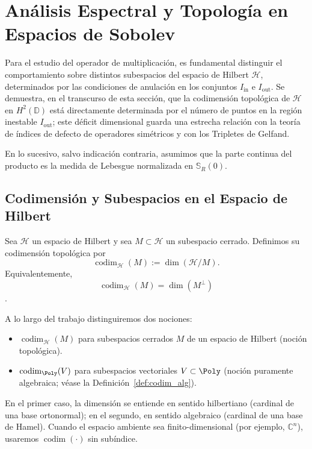 
\chapter{Análisis Espectral y Topología en Espacios de Sobolev}\label{sec:espectral}

Para el estudio del operador de multiplicación, es fundamental distinguir el comportamiento sobre distintos subespacios del espacio de Hilbert $\mathcal{H}$, determinados por las condiciones de anulación en los conjuntos $I_{\mathrm{in}}$ e $I_{\mathrm{out}}$. Se demuestra, en el transcurso de esta sección, que la codimensión topológica de $\mathcal{H}$ en $H^2(\mathbb{D})$ está directamente determinada por el número de puntos en la región inestable $I_{\mathrm{out}}$; este déficit dimensional guarda una estrecha relación con la teoría de índices de defecto de operadores simétricos y con los Tripletes de Gelfand.

\begin{rmk}
	En lo sucesivo, salvo indicación contraria, asumimos que la parte continua del producto es la medida de Lebesgue normalizada en $\mathbb{S}_R(0)$.
\end{rmk}

\section{Codimensión y Subespacios en el Espacio de Hilbert}

\begin{defn}\label{def:codim_top_hilbert}
	Sea $\mathcal{H}$ un espacio de Hilbert y sea $M\subset \mathcal{H}$ un subespacio cerrado. Definimos su codimensión topológica por
	$$
		\operatorname{codim}_{\mathcal{H}}(M):=\dim(\mathcal{H}/M).
	$$
	Equivalentemente,
	$$
		\operatorname{codim}_{\mathcal{H}}(M)=\dim(M^\perp)
	$$
	\cite{halmos1982hilbert}.
\end{defn}

\begin{rmk}\label{rem:convencion_codim}
	A lo largo del trabajo distinguiremos dos nociones:
	\begin{itemize}
		\item $\operatorname{codim}_{\mathcal{H}}(M)$ para subespacios cerrados $M$ de un espacio de Hilbert (noción topológica).
		\item $\operatorname{codim}_{\Poly}(V)$ para subespacios vectoriales $V\subset \Poly$ (noción puramente algebraica; véase la Definición~\ref{def:codim_alg}).
	\end{itemize}
	En el primer caso, la dimensión se entiende en sentido hilbertiano (cardinal de una base ortonormal); en el segundo, en sentido algebraico (cardinal de una base de Hamel).
	Cuando el espacio ambiente sea finito-dimensional (por ejemplo, $\mathbb{C}^n$), usaremos $\operatorname{codim}(\cdot)$ sin subíndice.
\end{rmk}


